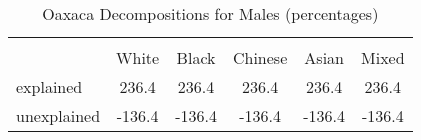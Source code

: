 \begin{table}[htbp]\centering
\caption{Oaxaca Decompositions for Males (percentages)}
\begin{tabular}{l*{5}{c}}
\hline\hline
          &         &         &         &         &         \\
          &    White&    Black&  Chinese&    Asian&    Mixed\\
\hline
explained &    236.4&    236.4&    236.4&    236.4&    236.4\\
unexplained&   -136.4&   -136.4&   -136.4&   -136.4&   -136.4\\
\hline\hline
\end{tabular}
\end{table}
